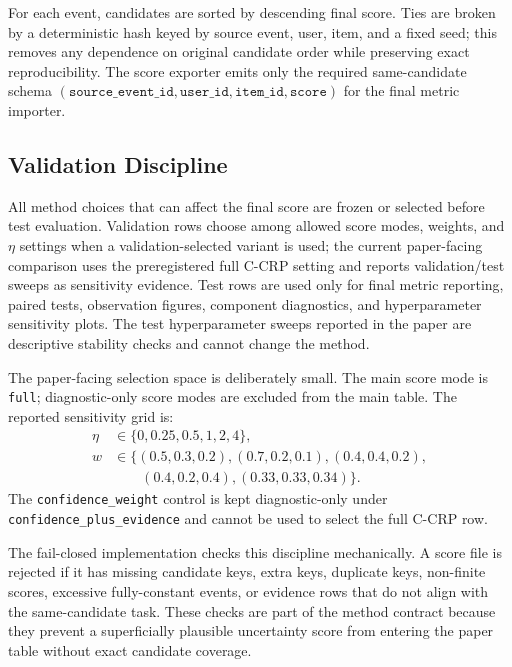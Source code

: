 For each event, candidates are sorted by descending final score. Ties
are broken by a deterministic hash keyed by source event, user, item, and a
fixed seed; this removes any dependence on original candidate order while
preserving exact reproducibility. The score exporter emits only the required
same-candidate schema $(\texttt{source\_event\_id},\texttt{user\_id},
\texttt{item\_id},\texttt{score})$ for the final metric importer.

\subsection{Validation Discipline}

All method choices that can affect the final score are frozen or selected
before test evaluation. Validation rows choose among allowed score modes,
weights, and $\eta$ settings when a validation-selected variant is used; the
current paper-facing comparison uses the preregistered full C-CRP setting and
reports validation/test sweeps as sensitivity evidence. Test rows are used only
for final metric reporting, paired tests, observation figures, component
diagnostics, and hyperparameter sensitivity plots. The test hyperparameter
sweeps reported in the paper are descriptive stability checks and cannot change
the method.

The paper-facing selection space is deliberately small. The main score mode is
\texttt{full}; diagnostic-only score modes are excluded from the main table.
The reported sensitivity grid is:
\[
\begin{aligned}
\eta &\in \{0,0.25,0.5,1,2,4\},\\
w &\in \{(0.5,0.3,0.2),(0.7,0.2,0.1),(0.4,0.4,0.2),\\
  &\qquad (0.4,0.2,0.4),(0.33,0.33,0.34)\}.
\end{aligned}
\]
The \texttt{confidence\_weight} control is kept diagnostic-only under
\texttt{confidence\_plus\_evidence} and cannot be used to select the full
C-CRP row.

The fail-closed implementation checks this discipline mechanically. A score
file is rejected if it has missing candidate keys, extra keys, duplicate keys,
non-finite scores, excessive fully-constant events, or evidence rows that do
not align with the same-candidate task. These checks are part of the method
contract because they prevent a superficially plausible uncertainty score from
entering the paper table without exact candidate coverage.

